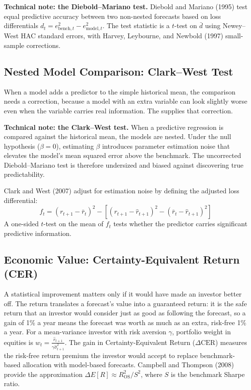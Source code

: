 \begin{technote}
\textbf{Technical note: the Diebold--Mariano test.} Diebold and Mariano (1995) test equal predictive accuracy between two non-nested forecasts based on loss differentials $d_t = e^2_{\text{bench},t} - e^2_{\text{model},t}$. The test statistic is a $t$-test on $\bar{d}$ using Newey--West HAC standard errors, with Harvey, Leybourne, and Newbold (1997) small-sample corrections.
\end{technote}

\subsection{Nested Model Comparison: Clark--West Test}
When a model adds a predictor to the simple historical mean, the comparison needs a correction, because a model with an extra variable can look slightly worse even when the variable carries real information. The  supplies that correction.

\begin{technote}
\textbf{Technical note: the Clark--West test.} When a predictive regression is compared against the historical mean, the models are nested. Under the null hypothesis ($\beta=0$), estimating $\beta$ introduces parameter estimation noise that elevates the model's mean squared error above the benchmark. The uncorrected Diebold--Mariano test is therefore undersized and biased against discovering true predictability.

Clark and West (2007) adjust for estimation noise by defining the adjusted loss differential:
\begin{equation}
  f_t = (r_{t+1} - \bar r_t)^2 - \left[(r_{t+1} - \hat r_{t+1})^2 - (\bar r_t - \hat r_{t+1})^2\right]
  \label{eq:09-cw}
\end{equation}
A one-sided $t$-test on the mean of $f_t$ tests whether the predictor carries significant predictive information.
\end{technote}

\subsection{Economic Value: Certainty-Equivalent Return (CER)}
A statistical improvement matters only if it would have made an investor better off. The  return translates a forecast's value into a guaranteed return: it is the safe return that an investor would consider just as good as following the forecast, so a gain of 1\% a year means the forecast was worth as much as an extra, risk-free 1\% a year. For a mean-variance investor with risk aversion $\gamma$, portfolio weight in equities is $w_t = \frac{\hat{r}_{t+1}}{\gamma \hat{\sigma}^2_{t+1}}$. The gain in Certainty-Equivalent Return ($\Delta \text{CER}$) measures the risk-free return premium the investor would accept to replace benchmark-based allocation with model-based forecasts. Campbell and Thompson (2008) provide the approximation $\Delta E[R] \approx R^2_{\text{OS}} / S^2$, where $S$ is the benchmark Sharpe ratio.

